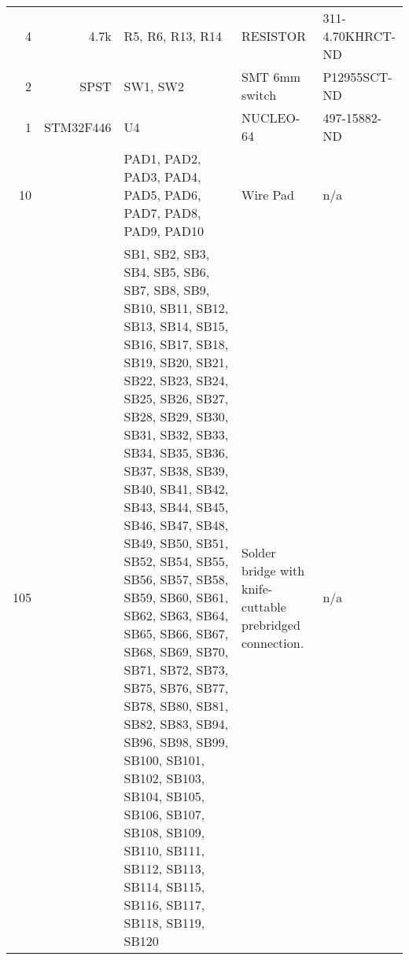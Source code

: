 \begin{longtable}{rrp{3in}p{1.5in}p{1.7in}}
	4 & 4.7k & R5, R6, R13, R14 & RESISTOR & 311-4.70KHRCT-ND \\ 
	2 & SPST & SW1, SW2 & SMT 6mm switch & P12955SCT-ND \\ 
	1 & STM32F446 & U4 & NUCLEO-64 & 497-15882-ND \\ 
	10 & & PAD1, PAD2, PAD3, PAD4, PAD5, PAD6, PAD7, PAD8, PAD9, PAD10 & Wire Pad & n/a \\ 
	105 & & SB1, SB2, SB3, SB4, SB5, SB6, SB7, SB8, SB9, SB10, SB11, SB12, SB13, SB14, SB15, SB16, SB17, SB18, SB19, SB20, SB21, SB22, SB23, SB24, SB25, SB26, SB27, SB28, SB29, SB30, SB31, SB32, SB33, SB34, SB35, SB36, SB37, SB38, SB39, SB40, SB41, SB42, SB43, SB44, SB45, SB46, SB47, SB48, SB49, SB50, SB51, SB52, SB54, SB55, SB56, SB57, SB58, SB59, SB60, SB61, SB62, SB63, SB64, SB65, SB66, SB67, SB68, SB69, SB70, SB71, SB72, SB73, SB75, SB76, SB77, SB78, SB80, SB81, SB82, SB83, SB94, SB96, SB98, SB99, SB100, SB101, SB102, SB103, SB104, SB105, SB106, SB107, SB108, SB109, SB110, SB111, SB112, SB113, SB114, SB115, SB116, SB117, SB118, SB119, SB120 & Solder bridge with knife-cuttable prebridged connection. & n/a \\ 
	\bottomrule
\end{longtable}